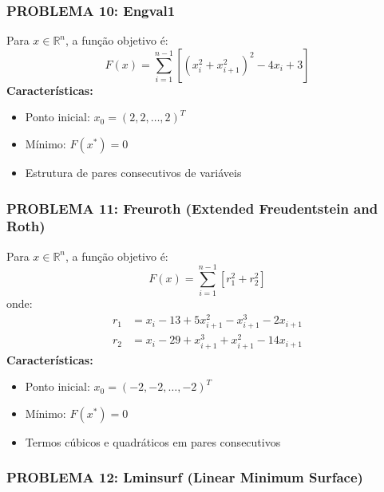 \documentclass[12pt,a4paper]{article}
\begin{document}
\subsubsection{\textbf{PROBLEMA 10: Engval1}}

Para $x \in \mathbb{R}^n$, a função objetivo é:
\begin{equation}
F(x) = \sum_{i=1}^{n-1} \left[(x_i^2 + x_{i+1}^2)^2 - 4x_i + 3\right]
\end{equation}
\textbf{Características:}
\begin{itemize}
\item Ponto inicial: $x_0 = (2, 2, \dots, 2)^T$
\item Mínimo: $F(x^*) = 0$
\item Estrutura de pares consecutivos de variáveis
\end{itemize}

\subsubsection{\textbf{PROBLEMA 11: Freuroth (Extended Freudentstein and Roth)}}

Para $x \in \mathbb{R}^n$, a função objetivo é:
\begin{equation}
F(x) = \sum_{i=1}^{n-1} \left[r_1^2 + r_2^2\right]
\end{equation}
onde:
\begin{align}
r_1 &= x_i - 13 + 5x_{i+1}^2 - x_{i+1}^3 - 2x_{i+1} \\
r_2 &= x_i - 29 + x_{i+1}^3 + x_{i+1}^2 - 14x_{i+1}
\end{align}
\textbf{Características:}
\begin{itemize}
\item Ponto inicial: $x_0 = (-2, -2, \dots, -2)^T$
\item Mínimo: $F(x^*) = 0$
\item Termos cúbicos e quadráticos em pares consecutivos
\end{itemize}

\subsubsection{\textbf{PROBLEMA 12: Lminsurf (Linear Minimum Surface)}}
\end{document}
